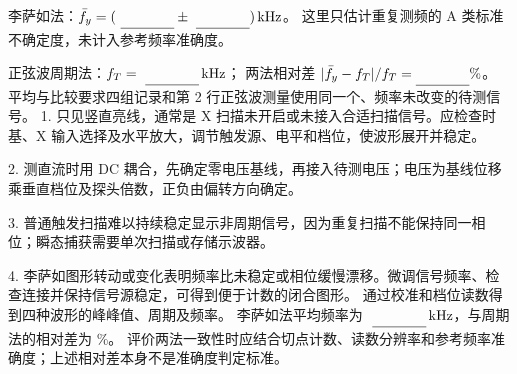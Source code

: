 \noindent 李萨如法：$\bar f_y=(\MathField{lissajous_mean_khz}\pm\MathField{lissajous_u_khz})\,\mathrm{kHz}$。
这里只估计重复测频的 A 类标准不确定度，未计入参考频率准确度。
\par 正弦波周期法：$f_T=\MathField{sine_frequency_khz}\,\mathrm{kHz}$；
两法相对差 $|\bar f_y-f_T|/f_T=\Field{method_difference_percent}\%$。
平均与比较要求四组记录和第 2 行正弦波测量使用同一个、频率未改变的待测信号。
1. 只见竖直亮线，通常是 X 扫描未开启或未接入合适扫描信号。应检查时基、X 输入选择及水平放大，调节触发源、电平和档位，使波形展开并稳定。\par
2. 测直流时用 DC 耦合，先确定零电压基线，再接入待测电压；电压为基线位移乘垂直档位及探头倍数，正负由偏转方向确定。\par
3. 普通触发扫描难以持续稳定显示非周期信号，因为重复扫描不能保持同一相位；瞬态捕获需要单次扫描或存储示波器。\par
4. 李萨如图形转动或变化表明频率比未稳定或相位缓慢漂移。微调信号频率、检查连接并保持信号源稳定，可得到便于计数的闭合图形。
通过校准和档位读数得到四种波形的峰峰值、周期及频率。
李萨如法平均频率为 $\MathField{lissajous_mean_khz}\,\mathrm{kHz}$，与周期法的相对差为 \%。
评价两法一致性时应结合切点计数、读数分辨率和参考频率准确度；上述相对差本身不是准确度判定标准。

\ReportRecord

